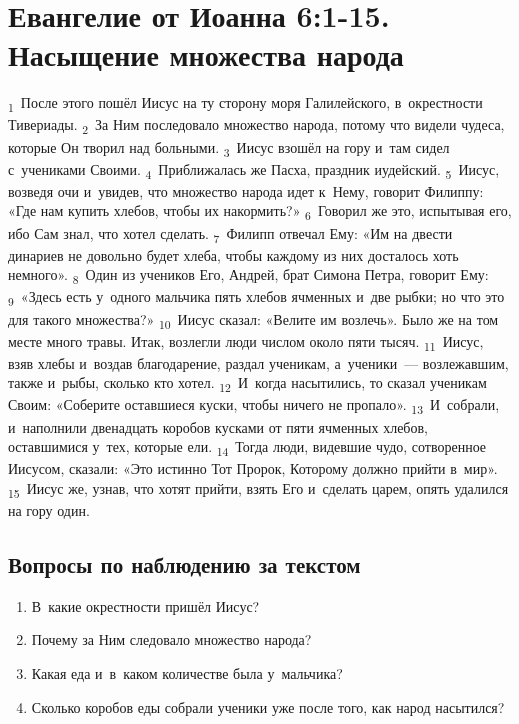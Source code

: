 \documentclass[a4paper,12pt]{article}
\begin{document}
\section{Евангелие от Иоанна 6:1-15. Насыщение множества народа}

\textsubscript{1}~После этого пошёл Иисус на ту сторону моря Галилейского, в~окрестности Тивериады. \textsubscript{2}~За Ним последовало множество народа, потому что видели чудеса, которые Он творил над больными. \textsubscript{3}~Иисус взошёл на гору и~там сидел с~учениками Своими. \textsubscript{4}~Приближалась же Пасха, праздник иудейский. \textsubscript{5}~Иисус, возведя очи и~увидев, что множество народа идет к~Нему, говорит Филиппу: «Где нам купить хлебов, чтобы их накормить?» \textsubscript{6}~Говорил же это, испытывая его, ибо Сам знал, что хотел сделать. \textsubscript{7}~Филипп отвечал Ему: «Им на двести динариев не довольно будет хлеба, чтобы каждому из них досталось хоть немного». \textsubscript{8}~Один из учеников Его, Андрей, брат Симона Петра, говорит Ему: \textsubscript{9}~«Здесь есть у~одного мальчика пять хлебов ячменных и~две рыбки; но что это для такого множества?» \textsubscript{10}~Иисус сказал: «Велите им возлечь». Было же на том месте много травы. Итак, возлегли люди числом около пяти тысяч. \textsubscript{11}~Иисус, взяв хлебы и~воздав благодарение, раздал ученикам, а~ученики~--- возлежавшим, также и~рыбы, сколько кто хотел. \textsubscript{12}~И~когда насытились, то сказал ученикам Своим: «Соберите оставшиеся куски, чтобы ничего не пропало». \textsubscript{13}~И~собрали, и~наполнили двенадцать коробов кусками от пяти ячменных хлебов, оставшимися у~тех, которые ели. \textsubscript{14}~Тогда люди, видевшие чудо, сотворенное Иисусом, сказали: «Это истинно Тот Пророк, Которому должно прийти в~мир». \textsubscript{15}~Иисус же, узнав, что хотят прийти, взять Его и~сделать царем, опять удалился на гору один. 

\subsection*{Вопросы по наблюдению за текстом}
\begin{enumerate}
    \item В~какие окрестности пришёл Иисус? 
    
    \myline
    
    \item Почему за Ним следовало множество народа? 
    
    \myline
    
    \item Какая еда и~в~каком количестве была у~мальчика? 
    
    \myline
    
    \item Сколько коробов еды собрали ученики уже после того, как народ насытился? 
    
    \myline
\end{enumerate}
\end{document}
